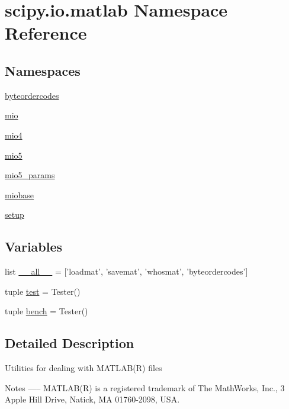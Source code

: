 \hypertarget{namespacescipy_1_1io_1_1matlab}{}\section{scipy.\+io.\+matlab Namespace Reference}
\label{namespacescipy_1_1io_1_1matlab}
\subsection*{Namespaces}
\begin{DoxyCompactItemize}
\item 
 \hyperlink{namespacescipy_1_1io_1_1matlab_1_1byteordercodes}{byteordercodes}
\item 
 \hyperlink{namespacescipy_1_1io_1_1matlab_1_1mio}{mio}
\item 
 \hyperlink{namespacescipy_1_1io_1_1matlab_1_1mio4}{mio4}
\item 
 \hyperlink{namespacescipy_1_1io_1_1matlab_1_1mio5}{mio5}
\item 
 \hyperlink{namespacescipy_1_1io_1_1matlab_1_1mio5__params}{mio5\+\_\+params}
\item 
 \hyperlink{namespacescipy_1_1io_1_1matlab_1_1miobase}{miobase}
\item 
 \hyperlink{namespacescipy_1_1io_1_1matlab_1_1setup}{setup}
\end{DoxyCompactItemize}
\subsection*{Variables}
\begin{DoxyCompactItemize}
\item 
list \hyperlink{namespacescipy_1_1io_1_1matlab_ac81ea00218fe5b848367eaef0aa2b159}{\+\_\+\+\_\+all\+\_\+\+\_\+} = \mbox{[}'loadmat', 'savemat', 'whosmat', 'byteordercodes'\mbox{]}
\item 
tuple \hyperlink{namespacescipy_1_1io_1_1matlab_a8a23168bc23df308726c9f0ee10b3a28}{test} = Tester()
\item 
tuple \hyperlink{namespacescipy_1_1io_1_1matlab_a82afe4cace6a0b53fab5265a997b1e20}{bench} = Tester()
\end{DoxyCompactItemize}


\subsection{Detailed Description}
\begin{DoxyVerb}Utilities for dealing with MATLAB(R) files

Notes
-----
MATLAB(R) is a registered trademark of The MathWorks, Inc., 3 Apple Hill
Drive, Natick, MA 01760-2098, USA.\end{DoxyVerb}
 

